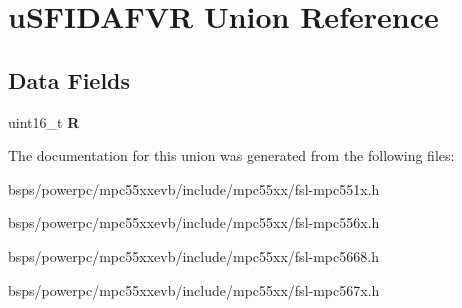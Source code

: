 \hypertarget{unionuSFIDAFVR}{}\section{u\+S\+F\+I\+D\+A\+F\+VR Union Reference}
\label{unionuSFIDAFVR}
\subsection*{Data Fields}
\begin{DoxyCompactItemize}
\item 
\mbox{\label{unionuSFIDAFVR_a69c6c6a65834778c57472fecdf845a16}} 
uint16\+\_\+t {\bfseries R}
\end{DoxyCompactItemize}


The documentation for this union was generated from the following files\+:\begin{DoxyCompactItemize}
\item 
bsps/powerpc/mpc55xxevb/include/mpc55xx/fsl-\/mpc551x.\+h\item 
bsps/powerpc/mpc55xxevb/include/mpc55xx/fsl-\/mpc556x.\+h\item 
bsps/powerpc/mpc55xxevb/include/mpc55xx/fsl-\/mpc5668.\+h\item 
bsps/powerpc/mpc55xxevb/include/mpc55xx/fsl-\/mpc567x.\+h\end{DoxyCompactItemize}
